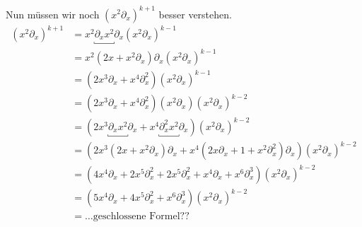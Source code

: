 Nun müssen wir noch $(x^2\partial_x)^{k+1}$ besser verstehen.
\begin{align*}
(x^2\partial_x)^{k+1} &=x^2\underbracket{\partial_xx^2}\partial_x
                        (x^2\partial_x)^{k-1}\\
                      &=x^2(2x+x^{2}\partial_x)\partial_x(x^2\partial_x)^{k-1}\\
                      &=(2x^3\partial_x+x^{4}\partial_x^2)
                        (x^2\partial_x)^{k-1}\\
                      &=(2x^3\partial_x+x^{4}\partial_x^2)(x^2\partial_x)
                        (x^2\partial_x)^{k-2}\\
                      &=(2x^3\underbracket{\partial_xx^2}\partial_x
                        +x^{4}\underbracket{\partial_x^2x^2}\partial_x)
                        (x^2\partial_x)^{k-2}\\
                      &=(2x^3(2x+x^{2}\partial_x)\partial_x
                        +x^{4}(2x\partial_x+1+x^2\partial_x^2)\partial_x)
                        (x^2\partial_x)^{k-2}\\
                      &=(4x^4\partial_x+2x^{5}\partial_x^2
                        +2x^{5}\partial_x^2
                        +x^4\partial_x
                        +x^6\partial_x^3)
                        (x^2\partial_x)^{k-2}\\
                      &=(5x^4\partial_x+4x^{5}\partial_x^2
                        +x^6\partial_x^3)
                        (x^2\partial_x)^{k-2}\\
                      &=\dots \mbox{geschlossene Formel??}
\end{align*}
